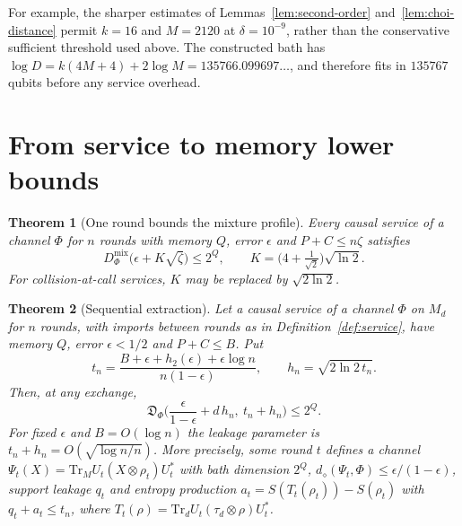 \documentclass[11pt,a4paper]{article}
\theoremstyle{plain}
\newtheorem{theorem}{Theorem}[section]
\theoremstyle{definition}
\theoremstyle{remark}
\newcommand{\Dmix}{D^{\mathrm{mix}}}
\newcommand{\ddia}{d_\diamond}
\newcommand{\Dsupp}{\mathfrak{D}}
\begin{document}
For example, the sharper estimates of Lemmas~\ref{lem:second-order} and~\ref{lem:choi-distance} permit $k=16$ and $M=2120$ at $\delta=10^{-9}$,
rather than the conservative sufficient threshold used above. The constructed bath has
$\log D=k(4M+4)+2\log M=135766.099697\ldots$, and therefore fits in $135767$ qubits before any service overhead.



\section{From service to memory lower bounds}\label{sec:bridge}


\begin{theorem}[One round bounds the mixture profile]\label{thm:bridge}
Every causal service of a channel $\Phi$ for $n$ rounds with memory $Q$, error $\epsilon$ and $P+C\le n\zeta$
satisfies
\[
\Dmix_\Phi\big(\epsilon+K\sqrt{\zeta}\big)\le 2^Q,\qquad K=\big(4+\tfrac{1}{\sqrt2}\big)\sqrt{\ln2}.
\]
For collision-at-call services, $K$ may be replaced by $\sqrt{2\ln2}$.
\end{theorem}

\begin{theorem}[Sequential extraction]\label{thm:sequential}
Let a causal service of a channel $\Phi$ on $M_d$ for $n$ rounds, with imports between rounds as in
Definition~\ref{def:service}, have memory $Q$, error $\epsilon<1/2$ and $P+C\le B$. Put
\[
t_n=\frac{B+\epsilon+h_2(\epsilon)+\epsilon\log n}{n(1-\epsilon)},\qquad h_n=\sqrt{2\ln2\,t_n}.
\]
Then, at any exchange,
\[
\Dsupp_\Phi\Big(\frac{\epsilon}{1-\epsilon}+d\,h_n,\ t_n+h_n\Big)\le2^Q.
\]
For fixed $\epsilon$ and $B=O(\log n)$ the leakage parameter is $t_n+h_n=O(\sqrt{\log n/n})$. More precisely,
some round $t$ defines a channel $\Psi_t(X)=\mathrm{Tr}_MU_t(X\otimes\rho_t)U_t^*$ with bath dimension $2^Q$,
$\ddia(\Psi_t,\Phi)\le\epsilon/(1-\epsilon)$, support leakage $q_t$ and entropy production $a_t=S(T_t(\rho_t))-S(\rho_t)$ with $q_t+a_t\le t_n$,
where $T_t(\rho)=\mathrm{Tr}_dU_t(\tau_d\otimes\rho)U_t^*$.
\end{theorem}
\end{document}
